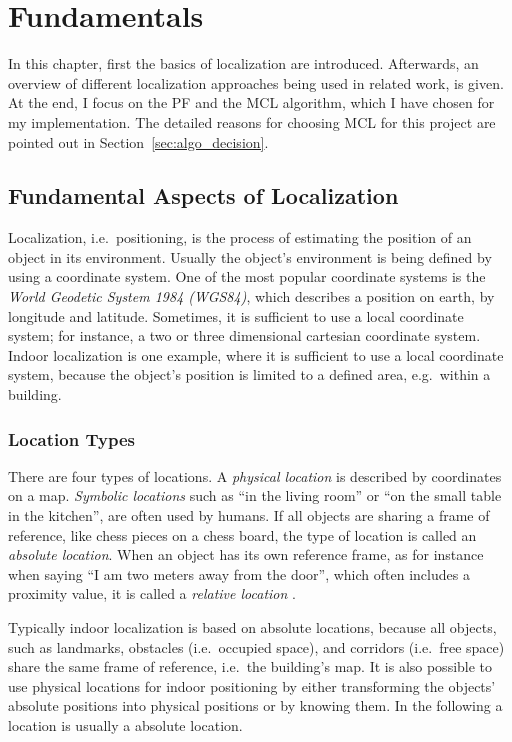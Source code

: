 \chapter{Fundamentals}\label{chap:fundamentals}

In this chapter, first the basics of localization are introduced. Afterwards, an overview of different localization approaches being used in related work, is given. At the end, I focus on the \acl{PF} and the \acl{MCL} algorithm, which I have chosen for my implementation. The detailed reasons for choosing \ac{MCL} for this project are pointed out in Section~\ref{sec:algo_decision}.

\section{Fundamental Aspects of Localization}\label{sec:fund_loc}

Localization, i.e.\ positioning, is the process of estimating the position of an object in its environment. Usually the object's environment is being defined by using a coordinate system. One of the most popular coordinate systems is the \emph{World Geodetic System 1984 (WGS84)}, which describes a position on earth, by longitude and latitude. Sometimes, it is sufficient to use a local coordinate system; for instance, a two or three dimensional cartesian coordinate system. Indoor localization is one example, where it is sufficient to use a local coordinate system, because the object's position is limited to a defined area, e.g.\ within a building.

\subsection{Location Types}
There are four types of locations. A \emph{physical location} is described by coordinates on a map. \emph{Symbolic locations} such as ``in the living room'' or ``on the small table in the kitchen'', are often used by humans. If all objects are sharing a frame of reference, like chess pieces on a chess board, the type of location is called an \emph{absolute location}. When an object has its own reference frame, as for instance when saying ``I am two meters away from the door'', which often includes a proximity value, it is called a \emph{relative location} \citep{IEEE:survey_wireless_indoor_pos}.

Typically indoor localization is based on absolute locations, because all objects, such as landmarks, obstacles (i.e.\ occupied space), and corridors (i.e.\ free space) share the same frame of reference, i.e.\ the building's map. It is also possible to use physical locations for indoor positioning by either transforming the objects' absolute positions into physical positions or by knowing them. In the following a location is usually a absolute location.


